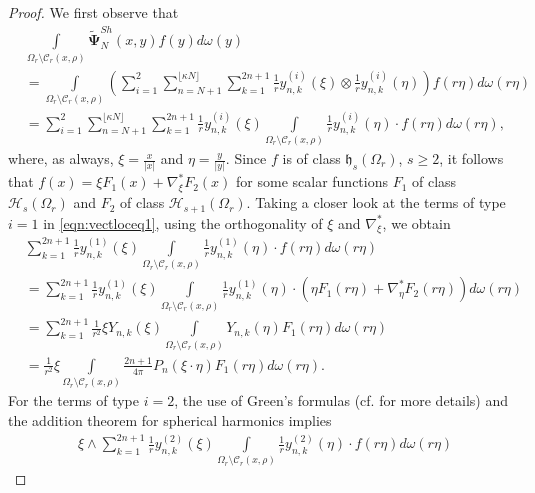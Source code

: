 \documentclass[a4paper, 10pt]{article}
\numberwithin{equation}{section}
\theoremstyle{definition}
\begin{document}
\begin{proof}
We first observe that
\begin{align}\label{eqn:vectloceq1}
&\int\limits_{\Omega_r\setminus\mathcal{C}_r(x,\rho)}\tilde{\mathbf{\Psi}}^{Sh}_{N}(x,y) f(y)d\omega(y)
\\&=\int\limits_{\Omega_r\setminus\mathcal{C}_r(x,\rho)}\left(\sum_{i=1}^2\sum_{n=N+1}^{\lfloor\kappa N\rfloor}\sum_{k=1}^{2n+1}\frac{1}{r}y_{n,k}^{(i)}\left(\xi\right)\otimes \frac{1}{r}y_{n,k}^{(i)}\left(\eta\right)\right) f(r\eta)d\omega(r\eta)\nonumber
\\&=\sum_{i=1}^2\sum_{n=N+1}^{\lfloor\kappa N\rfloor}\sum_{k=1}^{2n+1}\frac{1}{r}y_{n,k}^{(i)}\left(\xi\right)\int\limits_{\Omega_r\setminus\mathcal{C}_r(x,\rho)}\frac{1}{r}y_{n,k}^{(i)}\left(\eta\right)\cdot f(r\eta)d\omega(r\eta),\nonumber
\end{align}
where, as always, $\xi=\frac{x}{|x|}$ and $\eta=\frac{y}{|y|}$. Since $f$ is of class $\mathfrak{h}_s(\Omega_r)$, $s\geq 2$, it follows that $f(x)=\xi F_1(x)+\nabla^*_\xi F_2(x)$ for some scalar functions $F_1$ of class $\mathcal{H}_s(\Omega_r)$ and $F_2$ of class $\mathcal{H}_{s+1}(\Omega_r)$. Taking a closer look at the terms of type $i=1$ in \eqref{eqn:vectloceq1}, using the orthogonality of $\xi$ and $\nabla^*_\xi$, we obtain
\begin{align}
&\sum_{k=1}^{2n+1}\frac{1}{r}y_{n,k}^{(1)}\left(\xi\right)\int\limits_{\Omega_r\setminus\mathcal{C}_r(x,\rho)}\frac{1}{r}y_{n,k}^{(1)}\left(\eta\right)\cdot f(r\eta)d\omega(r\eta)\label{eqn:eqn1}
\\&=\sum_{k=1}^{2n+1}\frac{1}{r}y_{n,k}^{(1)}\left(\xi\right)\int\limits_{\Omega_r\setminus\mathcal{C}_r(x,\rho)}\frac{1}{r}y_{n,k}^{(1)}\left(\eta\right)\cdot \left(\eta F_1(r\eta)+\nabla^*_{\eta}F_2(r\eta)\right)d\omega(r\eta)\nonumber
\\&=\sum_{k=1}^{2n+1}\frac{1}{r^2}\xi Y_{n,k}\left(\xi\right)\int\limits_{\Omega_r\setminus\mathcal{C}_r(x,\rho)}Y_{n,k}\left(\eta\right)F_1(r\eta)d\omega(r\eta)\nonumber
\\&=\frac{1}{r^2}\xi\int\limits_{\Omega_r\setminus\mathcal{C}_r(x,\rho)}\frac{2n+1}{4\pi}P_n\left(\xi\cdot\eta\right)F_1(r\eta)d\omega(r\eta).\nonumber
\end{align}
For the terms of type $i=2$, the use of Green's formulas (cf. \cite{ger11} for more details) and the addition theorem for spherical harmonics implies
\begin{align}
&\xi\wedge\sum_{k=1}^{2n+1}\frac{1}{r}y_{n,k}^{(2)}\left(\xi\right)\int\limits_{\Omega_r\setminus\mathcal{C}_r(x,\rho)}\frac{1}{r}y_{n,k}^{(2)}\left(\eta\right)\cdot f(r\eta)d\omega(r\eta)\label{eqn:shit}

\end{align}
\end{proof}
\end{document}
